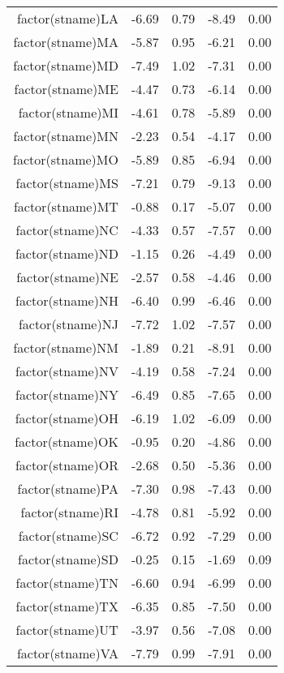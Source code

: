 \begin{table}[ht]
\begin{tabular}{rrrrr}
  factor(stname)LA & -6.69 & 0.79 & -8.49 & 0.00 \\ 
  factor(stname)MA & -5.87 & 0.95 & -6.21 & 0.00 \\ 
  factor(stname)MD & -7.49 & 1.02 & -7.31 & 0.00 \\ 
  factor(stname)ME & -4.47 & 0.73 & -6.14 & 0.00 \\ 
  factor(stname)MI & -4.61 & 0.78 & -5.89 & 0.00 \\ 
  factor(stname)MN & -2.23 & 0.54 & -4.17 & 0.00 \\ 
  factor(stname)MO & -5.89 & 0.85 & -6.94 & 0.00 \\ 
  factor(stname)MS & -7.21 & 0.79 & -9.13 & 0.00 \\ 
  factor(stname)MT & -0.88 & 0.17 & -5.07 & 0.00 \\ 
  factor(stname)NC & -4.33 & 0.57 & -7.57 & 0.00 \\ 
  factor(stname)ND & -1.15 & 0.26 & -4.49 & 0.00 \\ 
  factor(stname)NE & -2.57 & 0.58 & -4.46 & 0.00 \\ 
  factor(stname)NH & -6.40 & 0.99 & -6.46 & 0.00 \\ 
  factor(stname)NJ & -7.72 & 1.02 & -7.57 & 0.00 \\ 
  factor(stname)NM & -1.89 & 0.21 & -8.91 & 0.00 \\ 
  factor(stname)NV & -4.19 & 0.58 & -7.24 & 0.00 \\ 
  factor(stname)NY & -6.49 & 0.85 & -7.65 & 0.00 \\ 
  factor(stname)OH & -6.19 & 1.02 & -6.09 & 0.00 \\ 
  factor(stname)OK & -0.95 & 0.20 & -4.86 & 0.00 \\ 
  factor(stname)OR & -2.68 & 0.50 & -5.36 & 0.00 \\ 
  factor(stname)PA & -7.30 & 0.98 & -7.43 & 0.00 \\ 
  factor(stname)RI & -4.78 & 0.81 & -5.92 & 0.00 \\ 
  factor(stname)SC & -6.72 & 0.92 & -7.29 & 0.00 \\ 
  factor(stname)SD & -0.25 & 0.15 & -1.69 & 0.09 \\ 
  factor(stname)TN & -6.60 & 0.94 & -6.99 & 0.00 \\ 
  factor(stname)TX & -6.35 & 0.85 & -7.50 & 0.00 \\ 
  factor(stname)UT & -3.97 & 0.56 & -7.08 & 0.00 \\ 
  factor(stname)VA & -7.79 & 0.99 & -7.91 & 0.00 \\ 

\end{tabular}
\end{table}
